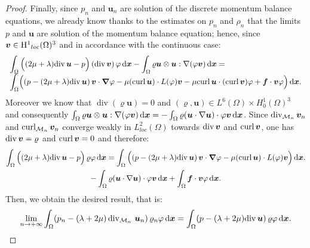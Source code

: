 \documentclass{amsart}
\numberwithin{equation}{section}
\begin{document}
\begin{proof}
Finally, since $p_n$ and ${{\boldsymbol u}}_n$ are solution of the discrete momentum balance equations, we already know thanks to the estimates on $p_n$ and $\rho_n$ that the limits $p$ and ${{\boldsymbol u}}$ are solution of the momentum balance equation; hence, since ${{\boldsymbol v}} \in {{\rm H}^{1}}_{loc}(\Omega)^3$ and in accordance with the continuous case:
\[
\begin{array}{l}
\displaystyle \int_\Omega \Big((2\mu+\lambda){{\rm div}} \, {{\boldsymbol u}}-p\Big)\, ({{\rm div}} \, {{\boldsymbol v}}) \,  \varphi {\, {\rm d}{{\boldsymbol x}}} - \int_\Omega {\varrho} {{\boldsymbol u}} \otimes {\bm{u}} : \nabla (\varphi {{\boldsymbol v}}) {\, {\rm d}{{\boldsymbol x}}} =
\\ \hfill
\displaystyle \int_\Omega \Bigl( (p-(2\mu+\lambda){{\rm div}} \, {{\boldsymbol u}})\, {{\boldsymbol v}} \cdot {{\boldsymbol \nabla}} \varphi 
- \mu({{\rm curl}} \, {{\boldsymbol u}})\cdot L(\varphi) {{\boldsymbol v}}  - \mu {{\rm curl}} \, {{\boldsymbol u}} \cdot ({{\rm curl}} \, {{\boldsymbol v}}) \varphi + {{\boldsymbol f}}\cdot {{\boldsymbol v}} \varphi  \Bigr) {\, {\rm d}{{\boldsymbol x}}}.
\end{array}
\]
Moreover we know that $\operatorname{div}({\varrho} {{\boldsymbol u}}) = 0 $ and $({\varrho},{{\boldsymbol u}}) \in L^6(\Omega) \times H_0^1(\Omega)^3 $ and consequently $ \int_\Omega {\varrho} {{\boldsymbol u}} \otimes {{\boldsymbol u}} : \nabla (\varphi {{\boldsymbol v}}) {\, {\rm d}{{\boldsymbol x}}} = -\int_\Omega {\varrho}( {{\boldsymbol u}} \cdot \nabla {{\boldsymbol u}})\cdot \varphi {{\boldsymbol v}} {\, {\rm d}{{\boldsymbol x}}}$.
Since  ${{\rm div}}_{{{\mathcal M}}_n} \,{{\boldsymbol v}}_n$ and ${{\rm curl}}_{{{\mathcal M}}_n} \,{{\boldsymbol v}}_n$ converge weakly in $L^2_{loc}(\Omega)$ towards ${{\rm div}} \,{{\boldsymbol v}}$ and ${{\rm curl}} \,{{\boldsymbol v}}$, one has ${{\rm div}} \,{{\boldsymbol v}}={\varrho}$ and ${{\rm curl}} \,{{\boldsymbol v}}=0$ and therefore:
\begin{multline*}
\int_\Omega \Big((2\mu+\lambda){{\rm div}} \, {{\boldsymbol u}}-p\Big)\, {\varrho} \varphi {\, {\rm d}{{\boldsymbol x}}} =
\int_\Omega \Big( (p-(2\mu+\lambda){{\rm div}} \, {{\boldsymbol u}})\, {{\boldsymbol v}} \cdot {{\boldsymbol \nabla}} \varphi 
- \mu({{\rm curl}} \, {{\boldsymbol u}})\cdot L(\varphi) {{\boldsymbol v}} \Big) {\, {\rm d}{{\boldsymbol x}}}. \\ 
-\int_\Omega {\varrho}( {{\boldsymbol u}} \cdot \nabla {{\boldsymbol u}})\cdot \varphi {{\boldsymbol v}}{\, {\rm d}{{\boldsymbol x}}} +\int_\Omega {{\boldsymbol f}}\cdot {{\boldsymbol v}} \varphi  {\, {\rm d}{{\boldsymbol x}}}.
\end{multline*}
Then, we obtain the desired result, that is:
\begin{equation}
 \lim_{{n {\rightarrow} + \infty}} \int_\Omega ( p_n -(\lambda+2\mu) \operatorname{div}_{{{\mathcal M}}_n} \, {{\boldsymbol u}}_n)\, {\varrho}_n \varphi {\, {\rm d}{{\boldsymbol x}}}= \int_\Omega (p -(\lambda+2\mu) {{\rm div}} \,{{\boldsymbol u}})\, {\varrho} \varphi {\, {\rm d}{{\boldsymbol x}}}.
\label{stromboli}\end{equation}
\end{proof}
\end{document}
